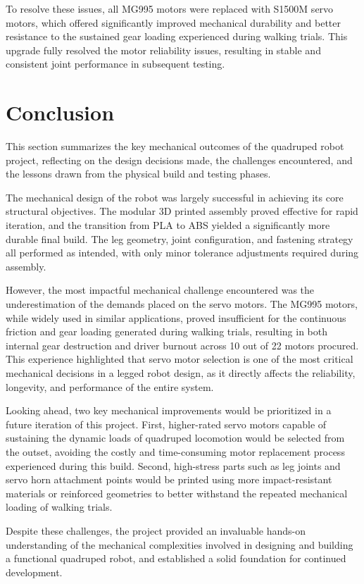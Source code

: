 \documentclass{article}
\begin{document}
\FloatBarrier

To resolve these issues, all MG995 motors were replaced with S1500M servo motors, which offered significantly improved mechanical durability and better resistance to the sustained gear loading experienced during walking trials. This upgrade fully resolved the motor reliability issues, resulting in stable and consistent joint performance in subsequent testing.
\section{Conclusion}

This section summarizes the key mechanical outcomes of the quadruped robot project, reflecting on the design decisions made, the challenges encountered, and the lessons drawn from the physical build and testing phases.

The mechanical design of the robot was largely successful in achieving its core structural objectives. The modular 3D printed assembly proved effective for rapid iteration, and the transition from PLA to ABS yielded a significantly more durable final build. The leg geometry, joint configuration, and fastening strategy all performed as intended, with only minor tolerance adjustments required during assembly.

However, the most impactful mechanical challenge encountered was the underestimation of the demands placed on the servo motors. The MG995 motors, while widely used in similar applications, proved insufficient for the continuous friction and gear loading generated during walking trials, resulting in both internal gear destruction and driver burnout across 10 out of 22 motors procured. This experience highlighted that servo motor selection is one of the most critical mechanical decisions in a legged robot design, as it directly affects the reliability, longevity, and performance of the entire system.

Looking ahead, two key mechanical improvements would be prioritized in a future iteration of this project. First, higher-rated servo motors capable of sustaining the dynamic loads of quadruped locomotion would be selected from the outset, avoiding the costly and time-consuming motor replacement process experienced during this build. Second, high-stress parts such as leg joints and servo horn attachment points would be printed using more impact-resistant materials or reinforced geometries to better withstand the repeated mechanical loading of walking trials.

Despite these challenges, the project provided an invaluable hands-on understanding of the mechanical complexities involved in designing and building a functional quadruped robot, and established a solid foundation for continued development.
\end{document}
